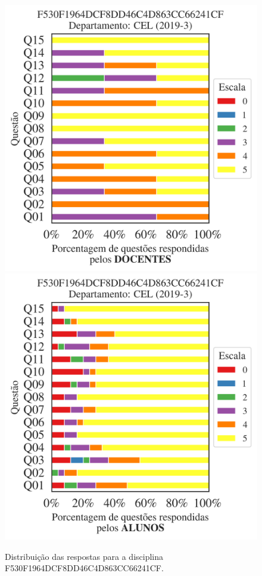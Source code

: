 \documentclass[a4paper,10pt]{article}
\begin{document}
\begin{figure}[h]
\centering
\includegraphics[width=0.485\linewidth]{analise_disciplina_departamento_CEL_F530F1964DCF8DD46C4D863CC66241CF_docentes.png}
\includegraphics[width=0.485\linewidth]{analise_disciplina_departamento_CEL_F530F1964DCF8DD46C4D863CC66241CF_alunos.png}
\caption{\label{fig:analise_geral_departamento}                Distribuição das respostas para a disciplina F530F1964DCF8DD46C4D863CC66241CF. }
\end{figure}
\end{document}
